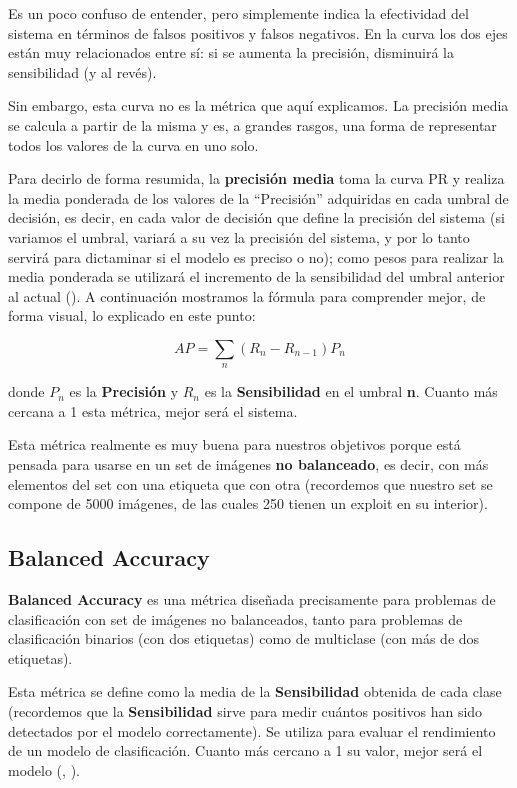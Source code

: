 Es un poco confuso de entender, pero simplemente indica la efectividad del sistema en términos de falsos positivos y falsos negativos. En la curva los dos ejes están muy relacionados entre sí: si se aumenta la precisión, disminuirá la sensibilidad (y al revés).

Sin embargo, esta curva no es la métrica que aquí explicamos. La precisión media se calcula a partir de la misma y es, a grandes rasgos, una forma de representar todos los valores de la curva en uno solo.

Para decirlo de forma resumida, la \textbf{precisión media} toma la curva \ac{PR} y realiza la media ponderada de los valores de la ``Precisión'' adquiridas en cada umbral de decisión, es decir, en cada valor de decisión que define la precisión del sistema (si variamos el umbral, variará a su vez la precisión del sistema, y por lo tanto servirá para dictaminar si el modelo es preciso o no); como pesos para realizar la media ponderada se utilizará el incremento de la sensibilidad del umbral anterior al actual (\cite{apscore}). A continuación mostramos la fórmula para comprender mejor, de forma visual, lo explicado en este punto: %

\begin{equation}\label{eq:apscore}
AP = \sum_{n}(R_n - R_{n-1})P_n
\end{equation}

donde $P_n$ es la \textbf{Precisión} y $R_n$ es la \textbf{Sensibilidad} en el umbral \textbf{n}. Cuanto más cercana a 1 esta métrica, mejor será el sistema.

Esta métrica realmente es muy buena para nuestros objetivos porque está pensada para usarse en un set de imágenes \textbf{no balanceado}, es decir, con más elementos del set con una etiqueta que con otra (recordemos que nuestro set se compone de 5000 imágenes, de las cuales 250 tienen un exploit en su interior).

\subsection{Balanced Accuracy}

\textbf{Balanced Accuracy} es una métrica diseñada precisamente para problemas de clasificación con set de imágenes no balanceados, tanto para problemas de clasificación binarios (con dos etiquetas) como de multiclase (con más de dos etiquetas).

Esta métrica se define como la media de la \textbf{Sensibilidad} obtenida de cada clase (recordemos que la \textbf{Sensibilidad} sirve para medir cuántos positivos han sido detectados por el modelo correctamente). Se utiliza para evaluar el rendimiento de un modelo de clasificación. Cuanto más cercano a 1 su valor, mejor será el modelo (\cite{balanced-accuracy}, \cite{balanced-accuracy-2}). %

